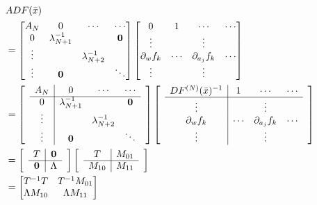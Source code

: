 \documentclass[11pt,a4paper]{jsarticle}
\theoremstyle{definition}
\begin{document}
\begin{equation}
  \begin{split}
    &ADF(\bar{x}) \\
    &= \begin{bmatrix}
      A_N & 0  & \cdots & \cdots  \\
      0 & \lambda_{N+1}^{-1} & & \mathbf{0} \\
      \vdots & & \lambda_{N+2}^{-1} & \\
      \vdots & \mathbf{0} & & \ddots
    \end{bmatrix}
    \begin{bmatrix}
      0 & 1  & \cdots & \cdots \\
      \vdots & & \vdots &\\
      \partial_w f_k & \cdots & \partial_{a_j}f_k & \cdots \\
      \vdots & & \vdots &
   \end{bmatrix}\\
    &= \begin{bmatrix}
      & \multicolumn{1}{c|}{A_N} & 0 & \cdots & \cdots  & \\ \cline{2-5}
      & \multicolumn{1}{c|}{0} & \lambda_{N+1}^{-1} & & \mathbf{0} & \\
      & \multicolumn{1}{c|}{\vdots} & & \lambda_{N+2}^{-1} & & \\
      & \multicolumn{1}{c|}{\vdots} & \mathbf{0} & & \ddots &
    \end{bmatrix}
    \begin{bmatrix}
      & \multicolumn{1}{c|}{DF^{(N)}(\bar{x})^{-1}} & 1  & \cdots & \cdots &\\ \cline{2-5}
      & \multicolumn{1}{c|}{\vdots} & & \vdots & &\\
      & \multicolumn{1}{c|}{\partial_w f_k} & \cdots & \partial_{a_j}f_k & \cdots &\\
      & \multicolumn{1}{c|}{\vdots} & & \vdots & &
    \end{bmatrix}\\
    &= \begin{bmatrix}
      & \multicolumn{1}{c|}{T} & \mathbf{0} &  \\ \cline{2-3}
      & \multicolumn{1}{c|}{\mathbf{0}} & \Lambda &
    \end{bmatrix}
    \begin{bmatrix}
      & \multicolumn{1}{c|}{T} & M_{01} &  \\ \cline{2-3}
      & \multicolumn{1}{c|}{M_{10}} & M_{11} &
    \end{bmatrix}\\
    &= \begin{bmatrix}
      T^{-1}T & T^{-1}M_{01} \\
      \Lambda M_{10} & \Lambda M_{11}
    \end{bmatrix}
  \end{split}
  \label{eq:ADF-0}
\end{equation}
\end{document}
